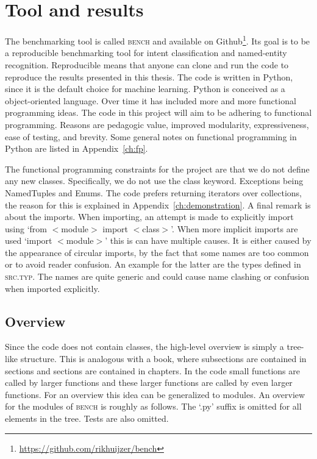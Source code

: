 \section{Tool and results}
\label{sec:bench}
The benchmarking tool is called \textsc{bench} and available on Github\footnote{\url{https://github.com/rikhuijzer/bench}}.
Its goal is to be a reproducible benchmarking tool for intent classification and named-entity recognition.
Reproducible means that anyone can clone and run the code to reproduce the results presented in this thesis.
The code is written in Python, since it is the default choice for machine learning.
Python is conceived as a object-oriented language.
Over time it has included more and more functional programming ideas.
The code in this project will aim to be adhering to functional programming.
Reasons are pedagogic value, improved modularity, expressiveness, ease of testing, and brevity.
Some general notes on functional programming in Python are listed in Appendix~\ref{ch:fp}.

The functional programming constraints for the project are that we do not define any new classes.
Specifically, we do not use the class keyword.
Exceptions being NamedTuples and Enums.
The code prefers returning iterators over collections, the reason for this is explained in Appendix~\ref{ch:demonstration}.
A final remark is about the imports.
When importing, an attempt is made to explicitly import using `from $<$module$>$ import $<$class$>$'.
When more implicit imports are used `import $<$module$>$' this is can have multiple causes.
It is either caused by the appearance of circular imports, by the fact that some names are too common or to avoid reader confusion.
An example for the latter are the types defined in \textsc{src.typ}.
The names are quite generic and could cause name clashing or confusion when imported explicitly.

\subsection{Overview}
\label{subsec:overview}
Since the code does not contain classes, the high-level overview is simply a tree-like structure.
This is analogous with a book, where subsections are contained in sections and sections are contained in chapters.
In the code small functions are called by larger functions and these larger functions are called by even larger functions.
For an overview this idea can be generalized to modules.
An overview for the modules of \textsc{bench} is roughly as follows.
The `.py' suffix is omitted for all elements in the tree.
Tests are also omitted.

